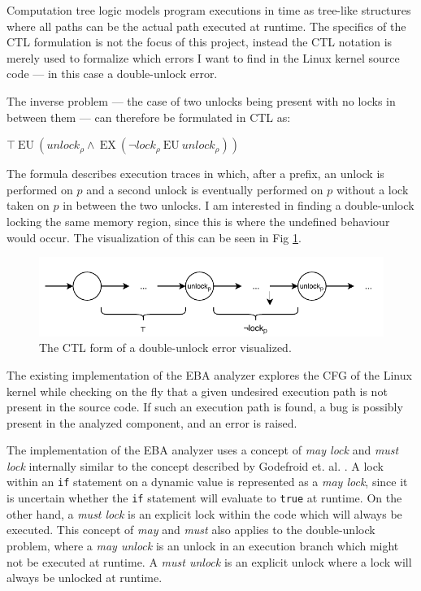 \newpar Computation tree logic models program executions in time as tree-like structures where all paths can be the actual path executed at runtime. The specifics of the CTL formulation is not the focus of this project, instead the CTL notation is merely used to formalize which errors I want to find in the Linux kernel source code --- in this case a double-unlock error.

\newpar The inverse problem --- the case of two unlocks being present with no locks in between them --- can therefore be formulated in CTL as: 

\begin{center}
    $\top\:\mathrm{EU}\:\left({u n l o c k}_{\rho} \wedge\:\mathrm{EX}\:\left(\neg {l o c k}_{\rho}\:\mathrm{EU}\:{u n l o c k}_{\rho}\right)\right)$
\end{center}

\newpar The formula describes execution traces in which, after a prefix, an unlock is performed on $p$ and a second unlock is eventually performed on $p$ without a lock taken on $p$ in between the two unlocks. I am interested in finding a double-unlock locking the same memory region, since this is where the undefined behaviour would occur. The visualization of this can be seen in Fig \ref{fig:doubleunlock}.

\begin{figure}[h]
    \centering
    \includegraphics{background/figures/doubleunlock}
    \caption{The CTL form of a double-unlock error visualized.}
    \label{fig:doubleunlock}
\end{figure}

\newpar The existing implementation of the EBA analyzer explores the CFG of the Linux kernel while checking on the fly that a given undesired execution path is not present in the source code. If such an execution path is found, a bug is possibly present in the analyzed component, and an error is raised.

\newpar The implementation of the EBA analyzer uses a concept of \textit{may lock} and \textit{must lock} internally similar to the concept described by Godefroid et. al. \cite{Godefroid}. A lock within an \texttt{if} statement on a dynamic value is represented as a \textit{may lock}, since it is uncertain whether the \texttt{if} statement will evaluate to \texttt{true} at runtime. On the other hand, a \textit{must lock} is an explicit lock within the code which will always be executed. This concept of \textit{may} and \textit{must} also applies to the double-unlock problem, where a \textit{may unlock} is an unlock in an execution branch which might not be executed at runtime. A \textit{must unlock} is an explicit unlock where a lock will always be unlocked at runtime.

